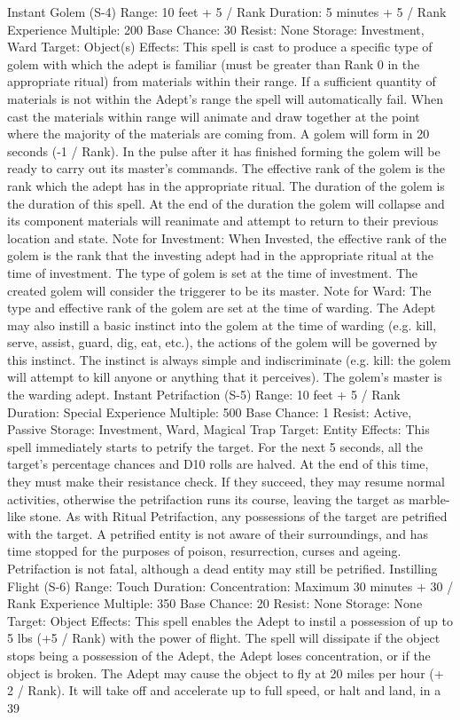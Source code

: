 \documentclass[a4paper]{article}
\begin{document}
\begin{multicols}{3}
Instant Golem (S-4)
Range: 10 feet + 5 / Rank
Duration: 5 minutes + 5 / Rank
Experience Multiple: 200
Base Chance: 30%
Resist: None
Storage: Investment, Ward
Target: Object(s)
Effects: This spell is cast to produce a specific type
of golem with which the adept is familiar (must be
greater than Rank 0 in the appropriate ritual) from
materials within their range.
If a sufficient quantity of materials is not within the
Adept’s range the spell will automatically fail.
When cast the materials within range will animate
and draw together at the point where the majority
of the materials are coming from. A golem will
form in 20 seconds (-1 / Rank). In the pulse after it
has finished forming the golem will be ready to
carry out its master’s commands.
The effective rank of the golem is the rank which
the adept has in the appropriate ritual.
The duration of the golem is the duration of this
spell. At the end of the duration the golem will
collapse and its component materials will reanimate and attempt to return to their previous
location and state.
Note for Investment: When Invested, the effective
rank of the golem is the rank that the investing
adept had in the appropriate ritual at the time of
investment. The type of golem is set at the time of
investment. The created golem will consider the
triggerer to be its master.
Note for Ward: The type and effective rank of the
golem are set at the time of warding. The Adept
may also instill a basic instinct into the golem at
the time of warding (e.g. kill, serve, assist, guard,
dig, eat, etc.), the actions of the golem will be
governed by this instinct. The instinct is always
simple and indiscriminate (e.g. kill: the golem will
attempt to kill anyone or anything that it perceives). The golem’s master is the warding adept.
Instant Petrifaction (S-5)
Range: 10 feet + 5 / Rank
Duration: Special
Experience Multiple: 500
Base Chance: 1%
Resist: Active, Passive
Storage: Investment, Ward, Magical Trap
Target: Entity
Effects: This spell immediately starts to petrify the
target. For the next 5 seconds, all the target’s percentage chances and D10 rolls are halved. At the
end of this time, they must make their resistance
check. If they succeed, they may resume normal
activities, otherwise the petrifaction runs its course,
leaving the target as marble-like stone.
As with Ritual Petrifaction, any possessions of the
target are petrified with the target. A petrified
entity is not aware of their surroundings, and has
time stopped for the purposes of poison, resurrection, curses and ageing. Petrifaction is not fatal,
although a dead entity may still be petrified.
Instilling Flight (S-6)
Range: Touch
Duration: Concentration: Maximum 30 minutes +
30 / Rank
Experience Multiple: 350
Base Chance: 20%
Resist: None
Storage: None
Target: Object
Effects: This spell enables the Adept to instil a
possession of up to 5 lbs (+5 / Rank) with the
power of flight. The spell will dissipate if the object stops being a possession of the Adept, the
Adept loses concentration, or if the object is broken. The Adept may cause the object to fly at 20
miles per hour (+ 2 / Rank). It will take off and
accelerate up to full speed, or halt and land, in a
39


\end{multicols}
\end{document}
